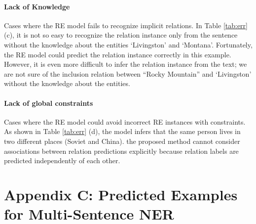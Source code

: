 \documentclass[11pt,a4paper]{article}
\begin{document}
\paragraph{Lack of Knowledge} Cases where the RE model fails to recognize implicit relations. In Table \ref{tab:err} (c), it is not so easy to recognize the relation instance  only from the sentence without the knowledge about the entities `Livingston' and `Montana'. Fortunately, the RE model could predict the relation instance correctly in this example. However, it is even more difficult to infer the relation instance  from the text; we are not sure of the inclusion relation between ``Rocky Mountain'' and `Livingston' without the knowledge about the entities.

\paragraph{Lack of global constraints} Cases where the RE model could avoid incorrect RE instances with constraints. As shown in Table \ref{tab:err} (d), the model infers that the same person lives in two different places (Soviet and China). the proposed method cannot consider associations between relation predictions explicitly because relation labels are predicted independently of each other.

\section*{Appendix C: Predicted Examples for Multi-Sentence NER }
\label{doclevel_example}
\end{document}
